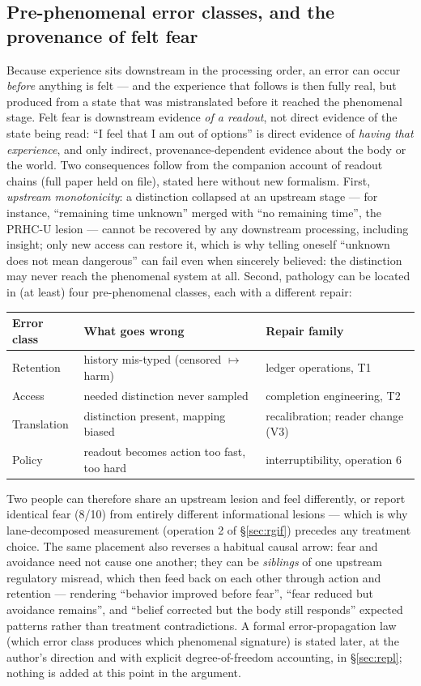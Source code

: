 \documentclass[9pt,twocolumn]{article}
\begin{document}
\subsection{Pre-phenomenal error classes, and the provenance of felt fear}
\label{sec:preerror}
Because experience sits downstream in the processing order, an error can occur \emph{before} anything is felt --- and the experience that follows is then fully real, but produced from a state that was mistranslated before it reached the phenomenal stage. Felt fear is downstream evidence \emph{of a readout}, not direct evidence of the state being read: ``I feel that I am out of options'' is direct evidence of \emph{having that experience}, and only indirect, provenance-dependent evidence about the body or the world. Two consequences follow from the companion account of readout chains \cite{lahtee2026rc} (full paper held on file), stated here without new formalism. First, \emph{upstream monotonicity}: a distinction collapsed at an upstream stage --- for instance, ``remaining time unknown'' merged with ``no remaining time'', the PRHC-U lesion --- cannot be recovered by any downstream processing, including insight; only new access can restore it, which is why telling oneself ``unknown does not mean dangerous'' can fail even when sincerely believed: the distinction may never reach the phenomenal system at all. Second, pathology can be located in (at least) four pre-phenomenal classes, each with a different repair:
\begin{center}
\footnotesize
\begin{tabularx}{\columnwidth}{@{}p{}Xp{}@{}}
\toprule
\textbf{Error class} & \textbf{What goes wrong} & \textbf{Repair family} \\
\midrule
Retention & history mis-typed (censored $\mapsto$ harm) & ledger operations, T1 \\
Access & needed distinction never sampled & completion engineering, T2 \\
Translation & distinction present, mapping biased & recalibration; reader change (V3) \\
Policy & readout becomes action too fast, too hard & interruptibility, operation 6 \\
\bottomrule
\end{tabularx}
\end{center}
Two people can therefore share an upstream lesion and feel differently, or report identical fear (8/10) from entirely different informational lesions --- which is why lane-decomposed measurement (operation 2 of \S\ref{sec:rgif}) precedes any treatment choice. The same placement also reverses a habitual causal arrow: fear and avoidance need not cause one another; they can be \emph{siblings} of one upstream regulatory misread, which then feed back on each other through action and retention --- rendering ``behavior improved before fear'', ``fear reduced but avoidance remains'', and ``belief corrected but the body still responds'' expected patterns rather than treatment contradictions. A formal error-propagation law (which error class produces which phenomenal signature) is stated later, at the author's direction and with explicit degree-of-freedom accounting, in \S\ref{sec:repl}; nothing is added at this point in the argument.
\end{document}
